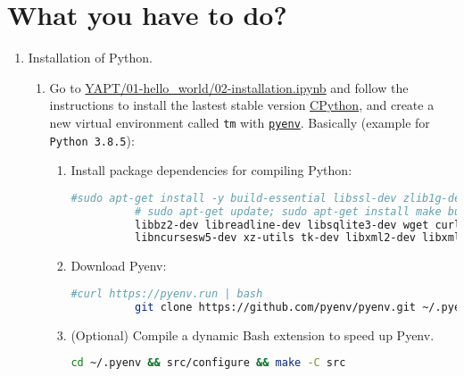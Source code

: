 \section{What you have to do?}

\begin{enumerate}
  
\item Installation of Python.
  
  \begin{enumerate}
    
  \item Go to
    \href{https://github.com/vicente-gonzalez-ruiz/YAPT/blob/master/01-hello_world/02-installation.ipynb}{YAPT/01-hello\_world/02-installation.ipynb}
    \cite{YAPT} and follow the instructions to install the lastest
    stable version
    \href{https://en.wikipedia.org/wiki/CPython}{CPython}, and create
    a new virtual environment called \texttt{tm} with
    \href{https://github.com/pyenv/pyenv}{\texttt{pyenv}}. Basically
    (example for \verb|Python 3.8.5|):

    \begin{enumerate}
      \item Install package dependencies for compiling Python:

        \begin{lstlisting}[mathescape=false, language=Bash]
          #sudo apt-get install -y build-essential libssl-dev zlib1g-dev libbz2-dev libreadline-dev libsqlite3-dev wget curl llvm libncurses5-dev libncursesw5-dev xz-utils tk-dev libffi-dev liblzma-dev git
          # sudo apt-get update; sudo apt-get install make build-essential libssl-dev zlib1g-dev \
          libbz2-dev libreadline-dev libsqlite3-dev wget curl llvm \
          libncursesw5-dev xz-utils tk-dev libxml2-dev libxmlsec1-dev libffi-dev liblzma-dev
        \end{lstlisting}

        \item Download Pyenv:
        \begin{lstlisting}[mathescape=false, language=Bash]
          #curl https://pyenv.run | bash
          git clone https://github.com/pyenv/pyenv.git ~/.pyenv
        \end{lstlisting}
        
      \item (Optional) Compile a dynamic Bash extension to speed up
        Pyenv.
        \begin{lstlisting}[mathescape=false, language=Bash]
cd ~/.pyenv && src/configure && make -C src
        \end{lstlisting}


\end{enumerate}
\end{enumerate}
\end{enumerate}
